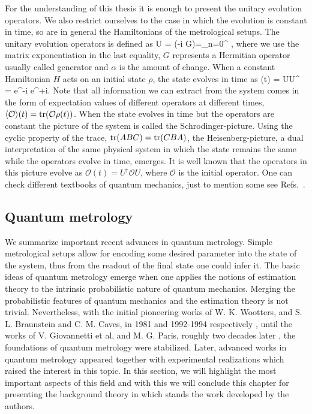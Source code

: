 For the understanding of this thesis it is enough to present the unitary evolution operators.
We also restrict ourselves to the case in which the evolution is constant in time, so are in general the Hamiltonians of the metrological setups.
The unitary evolution operators is defined as
\be
  U = \exp(-i \alpha G)=\sum_{n=0}^{\infty} ,
\ee
where we use the matrix exponentiation in the last equality, $G$ represents a Hermitian operator usually called generator and $\alpha$ is the amount of change.
When a constant Hamiltonian $H$ acts on an initial state $\rho$, the state evolves in time as
\be
  \rho(t) = U\rho U^{\dagger} = e^{-i} \rho e^{+i}.
\ee
Note that all information we can extract from the system comes in the form of expectation values of different operators at different times, $\langle \mathcal{O} \rangle(t) = \operatorname{tr}(\mathcal{O}\rho(t))$.
When the state evolves in time but the operators are constant the picture of the system is called the Schrodinger-picture.
Using the cyclic property of the trace, $\operatorname{tr}(ABC) = \operatorname{tr}(CBA)$, the Heisenberg-picture, a dual interpretation of the same physical system in which the state remains the same while the operators evolve in time, emerges.
It is well known that the operators in this picture evolve as $\mathcal{O}(t) = U^{\dagger} \mathcal{O} U$, where $\mathcal{O}$ is the initial operator.
One can check different textbooks of quantum mechanics, just to mention some see Refs.~\citep{Cohen-Tannoudji1977, Sakurai2014}.

\subsection{Quantum metrology}
\label{sec:bg-quantum-metrology}

We summarize important recent advances in quantum metrology.
Simple metrological setups allow for encoding some desired parameter into the state of the system, thus from the readout of the final state one could infer it.
The basic ideas of quantum metrology emerge when one applies the notions of estimation theory to the intrinsic probabilistic nature of quantum mechanics.
Merging the probabilistic features of quantum mechanics and the estimation theory is not trivial.
Nevertheless, with the initial pioneering works of W. K. Wootters, and S. L. Braunstein and C. M. Caves, in 1981 and 1992-1994 respectively \citep{Wootters1981, Braunstein1992, Braunstein1994}, until the works of V. Giovannetti et al, and M. G. Paris, roughly two decades later \citep{Giovannetti2004, Paris2009}, the foundations of quantum metrology were stabilized.
Later, advanced works in quantum metrology appeared \citep{XXX} together with experimental realizations \citep{Behbood2013, Koschorreck2011, Luecke2011} which raised the interest in this topic.
In this section, we will highlight the most important aspects of this field and with this we will conclude this chapter for presenting the background theory in which stands the work developed by the authors.

